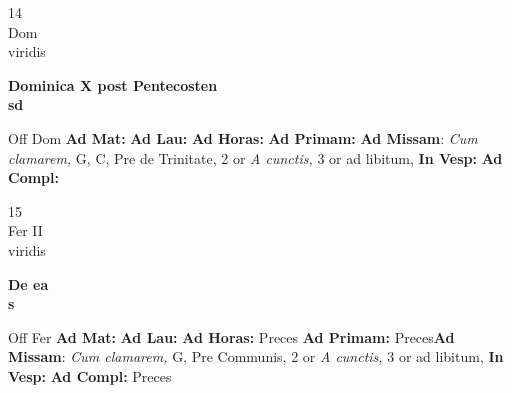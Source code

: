 \documentclass[10pt, openany]{book}
\begin{document}
    \begin{center}
        \begin{minipage}{3.5in}
            \vspace{2em}
            \begin{minipage}{0.5in}
                {\Huge 14} \\
                {\normalsize Dom} \\
                {\normalsize viridis}
            \end{minipage}
            \begin{minipage}{3.0in}
                \textbf{ \large Dominica X post Pentecosten \\
                \textnormal{\normalsize sd}} \\ 
            \end{minipage}
            \begin{justify}Off Dom
                \textbf{Ad Mat: }
                \textbf{Ad Lau: }
                \textbf{Ad Horas: }
                \textbf{Ad Primam: }\textbf{Ad Missam}: \textit{Cum clamarem,} G, C, Pre de Trinitate, 2 or \textit{A cunctis,} 3 or ad libitum,  
                \textbf{In Vesp: }
                \textbf{Ad Compl: }
            \end{justify}
        \end{minipage}
    \end{center}

    \begin{center}
        \begin{minipage}{3.5in}
            \vspace{2em}
            \begin{minipage}{0.5in}
                {\Huge 15} \\
                {\normalsize Fer II} \\
                {\normalsize viridis}
            \end{minipage}
            \begin{minipage}{3.0in}
                \textbf{ \large De ea \\
                \textnormal{\normalsize s}} \\ 
            \end{minipage}
            \begin{justify}Off Fer
                \textbf{Ad Mat: }
                \textbf{Ad Lau: }
                \textbf{Ad Horas: }Preces
                \textbf{Ad Primam: }Preces\textbf{Ad Missam}: \textit{Cum clamarem,} G, Pre Communis, 2 or \textit{A cunctis,} 3 or ad libitum,  
                \textbf{In Vesp: }
                \textbf{Ad Compl: }Preces
            \end{justify}
        \end{minipage}
    \end{center}
\end{document}
